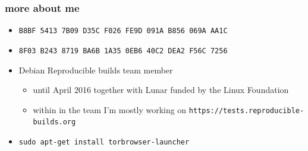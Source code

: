 \documentclass[14pt]{beamer}
\begin{document}
\begin{frame}
 \frametitle{more about me}

 \begin{itemize}
  \item \small{\texttt{B8BF 5413 7B09 D35C F026  FE9D 091A B856 069A AA1C}}
  \item \small{\texttt{8F03 B243 8719 BA6B 1A35  0EB6 40C2 DEA2 F56C 7256}}
  \item Debian Reproducible builds team member
  \begin{itemize}
   \item until April 2016 together with Lunar funded by the Linux Foundation
   \item within in the team I'm mostly working on
   \texttt{https://tests.reproducible-builds.org}
  \end{itemize}
  \item<2> \texttt{sudo apt-get install torbrowser-launcher}
\end{itemize}
\end{frame}
\end{document}

